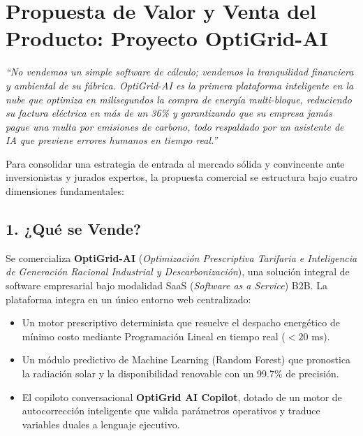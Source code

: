 \documentclass[11pt,a4paper]{article}
\begin{document}
\section{Propuesta de Valor y Venta del Producto: Proyecto OptiGrid-AI}

\begin{tcolorbox}[colback=codebg, colframe=primary, arc=3mm, title=\textbf{Elevator Pitch Comercial: Proyecto OptiGrid-AI}]
\textit{``No vendemos un simple software de cálculo; vendemos la tranquilidad financiera y ambiental de su fábrica. OptiGrid-AI es la primera plataforma inteligente en la nube que optimiza en milisegundos la compra de energía multi-bloque, reduciendo su factura eléctrica en más de un 36\% y garantizando que su empresa jamás pague una multa por emisiones de carbono, todo respaldado por un asistente de IA que previene errores humanos en tiempo real.''}
\end{tcolorbox}

Para consolidar una estrategia de entrada al mercado sólida y convincente ante inversionistas y jurados expertos, la propuesta comercial se estructura bajo cuatro dimensiones fundamentales:

\subsection{1. ¿Qué se Vende?}
Se comercializa \textbf{OptiGrid-AI} (\textit{Optimización Prescriptiva Tarifaria e Inteligencia de Generación Racional Industrial y Descarbonización}), una solución integral de software empresarial bajo modalidad SaaS (\textit{Software as a Service}) B2B. La plataforma integra en un único entorno web centralizado:
\begin{itemize}
    \item Un motor prescriptivo determinista que resuelve el despacho energético de mínimo costo mediante Programación Lineal en tiempo real ($<20$ ms).
    \item Un módulo predictivo de Machine Learning (Random Forest) que pronostica la radiación solar y la disponibilidad renovable con un 99.7\% de precisión.
    \item El copiloto conversacional \textbf{OptiGrid AI Copilot}, dotado de un motor de autocorrección inteligente que valida parámetros operativos y traduce variables duales a lenguaje ejecutivo.
\end{itemize}
\end{document}
